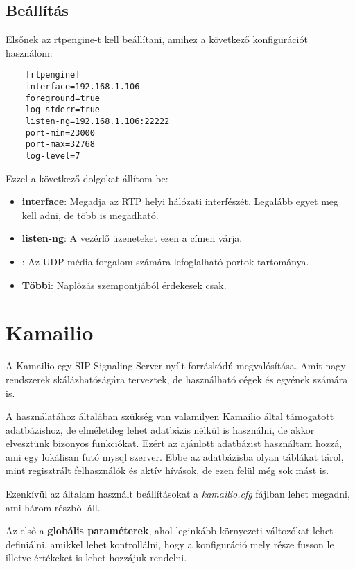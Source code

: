 \subsection{Beállítás}

Elsőnek az rtpengine-t kell beállítani, amihez a következő konfigurációt 
használom: 

\begin{lstlisting}
	[rtpengine]
	interface=192.168.1.106
	foreground=true
	log-stderr=true
	listen-ng=192.168.1.106:22222
	port-min=23000
	port-max=32768
	log-level=7
\end{lstlisting}

Ezzel a következő dolgokat állítom be: 

\begin{itemize}
	\item \textbf{interface}: Megadja az RTP helyi hálózati interfészét. Legalább
	egyet meg kell adni, de több is megadható.
	\item \textbf{listen-ng}: A vezérlő üzeneteket ezen a címen várja. 
	\item {}: Az UDP média forgalom számára lefoglalható
	portok tartománya. 
	\item \textbf{Többi}: Naplózás szempontjából érdekesek csak. 
\end{itemize}

\section{Kamailio}

A Kamailio egy SIP Signaling Server nyílt forráskódú megvalósítása. Amit nagy rendszerek
skálázhatóságára terveztek, de használható cégek és egyének számára is.

A használatához általában szükség van valamilyen Kamailio által támogatott adatbázishoz,
de elméletileg lehet adatbázis nélkül is használni, de akkor elvesztünk bizonyos funkciókat. 
Ezért az ajánlott adatbázist használtam hozzá, ami egy lokálisan futó mysql szerver. Ebbe 
az adatbázisba olyan táblákat tárol, mint regisztrált felhasználók és aktív hívások, de 
ezen felül még sok mást is. 

Ezenkívül az általam használt beállításokat a \textit{kamailio.cfg} fájlban lehet megadni,
ami három részből áll. 

Az első a \textbf{globális paraméterek}, ahol leginkább környezeti változókat lehet 
definiálni, amikkel lehet kontrollálni, hogy a konfiguráció mely része fusson le illetve
értékeket is lehet hozzájuk rendelni. 

